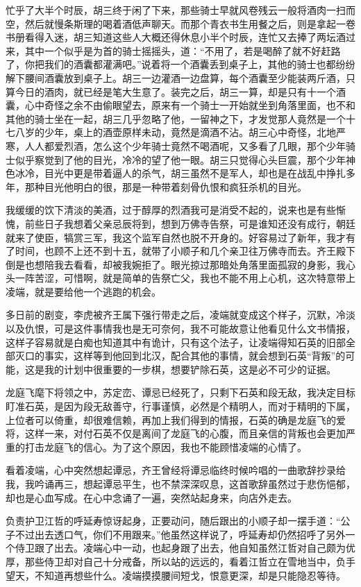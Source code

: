 忙乎了大半个时辰，胡三终于闲了下来，那些骑士早就风卷残云一般将酒肉一扫而空，然后就慢条斯理的喝着酒低声聊天。而那个青衣书生用餐之后，则是拿起一卷书册看得入迷，胡三知道这些人大概还得休息小半个时辰，连忙又去捧了两坛酒过来，其中一个似乎是为首的骑士摇摇头，道：“不用了，若是喝醉了就不好赶路了，你把我们的酒囊都灌满吧。”说着将一个酒囊丢到桌子上，其他的骑士也都纷纷解下腰间酒囊放到桌子上。胡三一边灌酒一边盘算，每个酒囊至少能装两斤酒，只算今日的酒肉，就已经是笔大生意了。装完之后，胡三一算，却是只有十一个酒囊，心中奇怪之余不由偷眼望去，原来有一个骑士一开始就坐到角落里面，也不和其他的骑士坐在一起，胡三几乎忽略了他，一留神之下，才发觉那人竟然是一个十七八岁的少年，桌上的酒壶原样未动，竟然是滴酒不沾。胡三心中奇怪，北地严寒，人人都爱烈酒，怎么这个少年骑士竟然不喝酒呢，又多看了几眼，那个少年骑士似乎察觉到了他的目光，冷冷的望了他一眼。胡三只觉得心头巨震，那个少年神色冰冷，目光中更是带着逼人的杀气，胡三虽然不是军人，却也是在战乱中挣扎多年，那种目光他明白的很，那是一种带着刻骨仇恨和疯狂杀机的目光。

我缓缓的饮下清淡的美酒，过于醇厚的烈酒我可是消受不起的，说来也是有些惭愧，前些日子我想着父亲忌辰将到，想到万佛寺告祭，可是谁知还没有成行，朝廷就来了使臣，犒赏三军，我这个监军自然也脱不开身的。好容易过了新年，我才有了时间，也顾不上还不到十五，就带了小顺子和几个亲卫往万佛寺而去。齐王殿下倒是也想陪我去看看，却被我婉拒了。眼光掠过那暗处角落里面孤寂的身影，我心头一阵苦涩，可惜啊，就是简单的告祭亡父，我也不能不用上心机，这次特意带上凌端，就是要给他一个逃跑的机会。

多日前的剧变，李虎被齐王属下强行带走之后，凌端就变成这个样子，沉默，冷淡以及仇恨，可是这件事情我也是无可奈何，我不可能故意让他看见什么文书情报，这样子容易就是白痴也知道其中有诡计，只有这个法子，让凌端得知石英的旧部全部灭口的事实，这样等到他回到北汉，配合其他的事情，就会想到石英“背叛”的可能，这是我的计划中很重要的一步棋，想要铲除石英，这是必不可少的证据。

龙庭飞麾下将领之中，苏定峦、谭忌已经死了，只剩下石英和段无敌，我决定目标盯准石英，是因为段无敌善守，行事谨慎，必然是个精明人，而对于精明的下属，上位者可以倚重，却很难信赖，再加上我们得到的情报，石英的确是龙庭飞的爱将，这样一来，对付石英不仅是离间了龙庭飞的心腹，而且亲信的背叛也会更加严重的打击龙庭飞的信心。为了这个原因，我也不能顾惜凌端的心情了。

看着凌端，心中突然想起谭忌，齐王曾经将谭忌临终时候吟唱的一曲歌辞抄录给我，我吟诵再三，想起谭忌平生，也不禁深深叹息，这首歌辞虽然过于悲伤悒郁，却也是心血写成。在心中念诵了一遍，突然站起身来，向店外走去。

负责护卫江哲的呼延寿惊讶起身，正要动问，随后跟出的小顺子却一摆手道：“公子不过出去透口气，你们不用跟来。”他虽然这样说了，呼延寿却仍然招呼了另外一个侍卫跟了出去。凌端心中一动，也起身跟了出去，他自知虽然江哲对自己颇为优厚，那些侍卫却对自己十分戒备，所以站的远远的，看着江哲立在雪地当中，负手望天，不知道再想些什么。凌端摸摸腰间短戈，恨意更深，却是只能隐忍等待。

